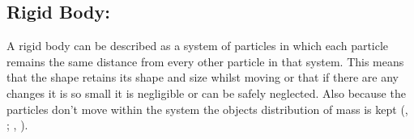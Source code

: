 \subsection{Rigid Body:}\label{sc:RigidBody}
A rigid body can be described as a system of particles in which each particle remains the same distance from every other particle in that system.
This means that the shape retains its shape and size whilst moving or that if there are any changes it is so small it is negligible or can be safely neglected.
Also because the particles don't move within the system the objects distribution of mass is kept (\citeauthor{bourg2013physics}, \citeyear{bourg2013physics}; \citeauthor{mactaggart2013l5}, \citeyear{mactaggart2013l5}). 